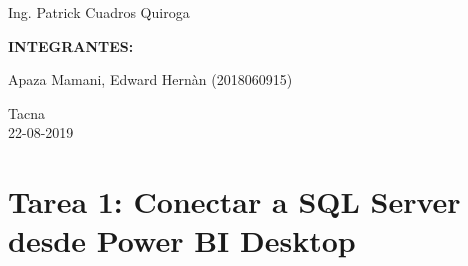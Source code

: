 \documentclass[12pt,letterpaper]{article}
\begin{document}
\begin{titlepage}
\begin{center}
\vspace*{0.1in}
\begin{large}
 Ing. Patrick Cuadros Quiroga\\
\end{large}

\vspace*{0.4in}
\vspace*{0.1in}
\begin{large}
\textbf{INTEGRANTES:} \\
\begin{flushleft}
Apaza Mamani, Edward Hernàn \hfill	(2018060915)\\

\centering  %
\vspace*{0.9in}
\begin{large}
Tacna\\ 22-08-2019
\end{large}

\end{flushleft}
\end{large}
\end{center}

\end{titlepage}


\tableofcontents %
\thispagestyle{empty} %
\newpage
\setcounter{page}{1} %


\section{Tarea 1: Conectar a SQL Server desde Power BI Desktop} 
\end{document}
